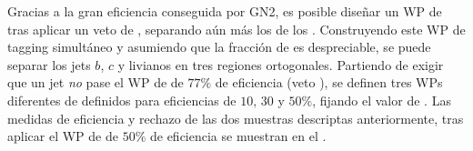 Gracias a la gran eficiencia \btagging conseguida por GN2, es posible diseñar un \ac{WP} de \ctagging tras aplicar un veto de \btagging, separando aún más los \cjets de los \ljets. Construyendo este \ac{WP} de tagging simultáneo y asumiendo que la fracción de \tjets es despreciable, se puede separar los jets \(b\), \(c\) y livianos en tres regiones ortogonales. Partiendo de exigir que un jet \textit{no} pase el \ac{WP} de \btagging de \(77\%\) de eficiencia (veto \btag), se definen tres \acp{WP} diferentes de \ctagging definidos para eficiencias de \(10, \, 30\) y \(50\%\), fijando el valor de \gntc. Las medidas de eficiencia y rechazo de las dos muestras descriptas anteriormente, tras aplicar el \ac{WP} de \ctag de \(50\%\) de eficiencia se muestran en el \Tab{\ref{tab:objects:ftag:ctag_efficiency_original}}.

\begin{table}[ht!]
    \caption{Medidas de eficiencia de \ctagging para \cjets, y valores de rechazos de \bjets, \ljets y \tjets en los regímenes de bajo y alto \pt. Los valores corresponden a aquellos luego de aplicar el veto del \ac{WP} de \btagging de \(77\%\) y de \(50\%\)  de \ctagging. }
    \label{tab:objects:ftag:ctag_efficiency_original}
\end{table}